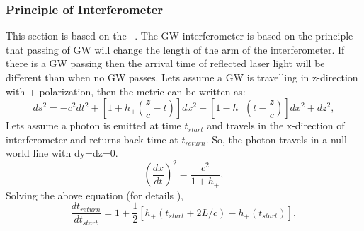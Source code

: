 \documentclass{ttuthes2007}
\begin{document}
\subsubsection{Principle of Interferometer}
This section is based on the ~\cite{Sathyaprakash_2009}. The
\ac{GW} interferometer is based on the principle that passing of \ac{GW} will
change the length of the arm of the interferometer. If there is a \ac{GW}
passing then the arrival time of reflected laser light will be different than when no
\ac{GW} passes. Lets assume a \ac{GW} is travelling in z-direction with +
polarization, then the metric can be written as:
\begin{equation}
ds^2= -c^2dt^2+[1+h_+(\frac{z}{c}-t)]dx^2+[1-h_+(t-\frac{z}{c})]dx^2+dz^2,
\end{equation}
Lets assume a photon is emitted at time $t_{start}$ and travels
in the x-direction of interferometer and returns back time at $t_{return}$. So,
the photon travels in a null world line with dy=dz=0.
\begin{equation}
\left(\frac{dx}{dt}\right)^2=\frac{c^2}{1+h_+},
\end{equation}
Solving the above equation (for details \cite{Schutz:1985jx}),
\begin{equation}
\frac{dt_{return}}{dt_{start}}=1+\frac{1}{2}[h_+(t_{start}+2L/c)-h_+(t_{start})],
\end{equation}
\end{document}
